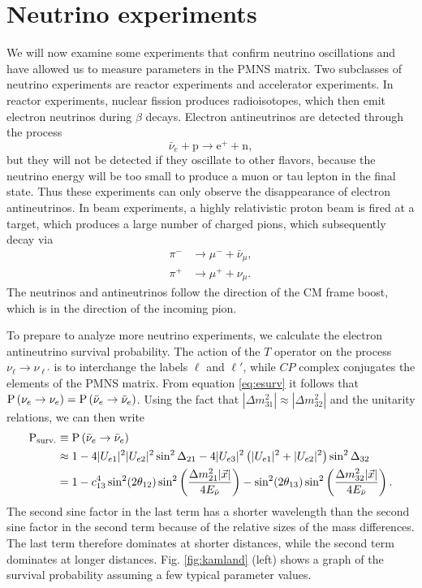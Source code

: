 \section{Neutrino experiments}
We will now examine some experiments that confirm neutrino oscillations and
have allowed us to measure parameters in the PMNS matrix.
Two subclasses of neutrino experiments are reactor experiments
and accelerator experiments. In reactor experiments, nuclear fission produces
radioisotopes, which then emit electron neutrinos during $\beta$ decays.
Electron antineutrinos are detected through the process
\begin{equation}
  \label{eq:betadecay}
  \bar{\nu}_e+\text{p}\to\text{e}^++\text{n},
\end{equation}
but they will not be detected if they oscillate to other flavors, because
the neutrino energy will be too small to produce a muon or tau lepton in
the final state. Thus these experiments can only observe the disappearance
of electron antineutrinos. In beam experiments, a highly relativistic
proton beam is fired at a target, which produces a large number of charged
pions, which subsequently decay via
\begin{equation}
  \begin{aligned}
    \pi^-&\to\mu^-+\bar{\nu}_\mu, \\
    \pi^+&\to\mu^++\nu_\mu.
  \end{aligned}
\end{equation}
The neutrinos and antineutrinos follow the direction of the CM frame boost,
which is in the direction of the incoming pion.

To prepare to analyze more neutrino experiments, we calculate the
electron antineutrino survival probability.
The action of the $T$ operator on the process $\nu_\ell\to\nu_{\ell'}$ is
to interchange the labels $\ell$ and $\ell'$, while $CP$ complex conjugates
the elements of the PMNS matrix. From equation \eqref{eq:esurv} it follows
that $\operatorname{P}\left(\nu_e\to\nu_e\right)=\operatorname{P}\left(\bar{\nu}_e\to\bar{\nu}_e\right)$. Using the fact
that $|\Delta m_{31}^2|\approx|\Delta m_{32}^2|$ and the unitarity relations,
we can then write
\begin{equation}
  \label{eq:prb}
  \begin{aligned}
    {\rm P}_{\rm surv.}&\equiv\operatorname{P}\left(\bar{\nu}_e\to\bar{\nu}_e\right)\\
      &\approx 1-4|U_{e1}|^2|U_{e2}|^2\sin^2\Delta_{21}
              -4|U_{e3}|^2\left(|U_{e1}|^2+|U_{e2}|^2\right)\sin^2\Delta_{32}
       \\ 
      &= 1-c_{13}^4\sin^2(2\theta_{12})
           \sin^2\left(\frac{\Delta m_{21}^2 |\vec{x}|}{4E_{\bar{\nu}}}
           \right) -\sin^2(2\theta_{13})
           \sin^2\left(\frac{\Delta m_{32}^2 |\vec{x}|}{4E_{\bar{\nu}}}
           \right).
  \end{aligned}
\end{equation}
The second sine factor in the last term has a shorter wavelength than the
second sine factor in the second term because of the relative sizes of the
mass differences. The last term therefore dominates at shorter distances,
while the second term dominates at longer distances. Fig. \ref{fig:kamland}
(left) shows a graph of the survival probability assuming a few typical 
parameter values.

